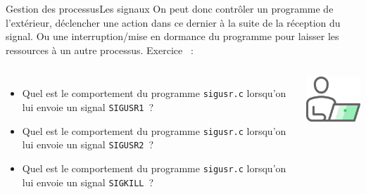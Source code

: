 \documentclass{beamer}
\begin{document}
    \begin{frame}{Gestion des processus}{Les signaux}
        On peut donc contrôler un programme de l'extérieur, déclencher une action dans ce dernier à la suite de la réception du signal.
        Ou une interruption/mise en dormance du programme pour laisser les ressources à un autre processus.
        \bigbreak
        Exercice \execcounterdispinc{}~:
        \begin{columns}
            \begin{itemize}
                \item Quel est le comportement du programme \lstinline{sigusr.c} lorsqu'on lui envoie un signal \lstinline{SIGUSR1}~?
                \item Quel est le comportement du programme \lstinline{sigusr.c} lorsqu'on lui envoie un signal \lstinline{SIGUSR2}~?
                \item Quel est le comportement du programme \lstinline{sigusr.c} lorsqu'on lui envoie un signal \lstinline{SIGKILL}~?
            \end{itemize}
            \centering
            \includegraphics[width=3cm]{image/guy-in-front-of-desktop}
        \end{columns}
    \end{frame}
\end{document}

